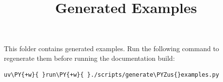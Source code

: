 \documentclass[a4paper,twoside]{article}
\title{Generated Examples}
\author{}\date{}
\begin{document}
\maketitle
This folder contains generated examples. Run the following command to regenerate them before running the documentation build:
\begin{tscode}[lang=bash, engine=pygments]
\begin{Verbatim}[commandchars=\\\{\},breaklines, breakanywhere, commandchars=\\\{\}]
uv\PY{+w}{ }run\PY{+w}{ }./scripts/generate\PYZus{}examples.py
\end{Verbatim}
\end{tscode}
\end{document}
